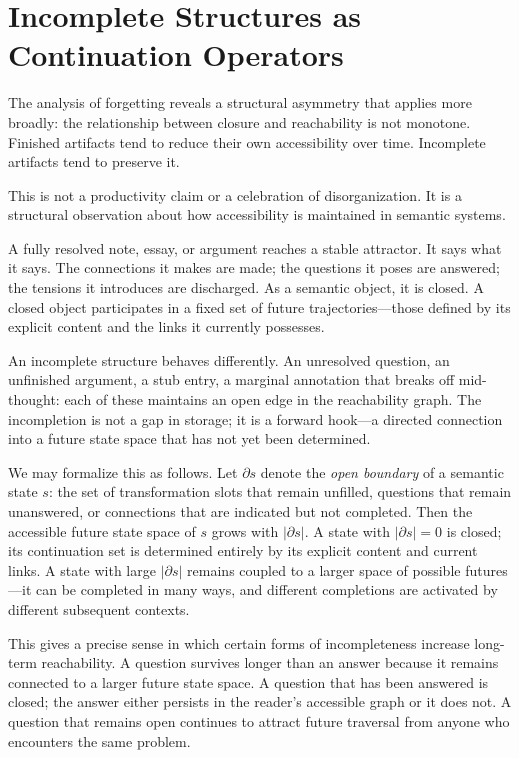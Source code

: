 \documentclass[12pt]{article}
\begin{document}
\section{Incomplete Structures as Continuation Operators}

The analysis of forgetting reveals a structural asymmetry that applies
more broadly: the relationship between closure and reachability is not
monotone.
Finished artifacts tend to reduce their own accessibility over time.
Incomplete artifacts tend to preserve it.

This is not a productivity claim or a celebration of disorganization.
It is a structural observation about how accessibility is maintained in
semantic systems.

A fully resolved note, essay, or argument reaches a stable attractor.
It says what it says.
The connections it makes are made; the questions it poses are answered;
the tensions it introduces are discharged.
As a semantic object, it is closed.
A closed object participates in a fixed set of future trajectories---those
defined by its explicit content and the links it currently possesses.

An incomplete structure behaves differently.
An unresolved question, an unfinished argument, a stub entry, a marginal
annotation that breaks off mid-thought: each of these maintains an open
edge in the reachability graph.
The incompletion is not a gap in storage; it is a forward hook---a
directed connection into a future state space that has not yet been
determined.

We may formalize this as follows.
Let $\partial s$ denote the \emph{open boundary} of a semantic state $s$:
the set of transformation slots that remain unfilled, questions that remain
unanswered, or connections that are indicated but not completed.
Then the accessible future state space of $s$ grows with $|\partial s|$.
A state with $|\partial s| = 0$ is closed; its continuation set is
determined entirely by its explicit content and current links.
A state with large $|\partial s|$ remains coupled to a larger space of
possible futures---it can be completed in many ways, and different
completions are activated by different subsequent contexts.

This gives a precise sense in which certain forms of incompleteness
increase long-term reachability.
A question survives longer than an answer because it remains connected
to a larger future state space.
A question that has been answered is closed; the answer either persists
in the reader's accessible graph or it does not.
A question that remains open continues to attract future traversal
from anyone who encounters the same problem.
\end{document}
